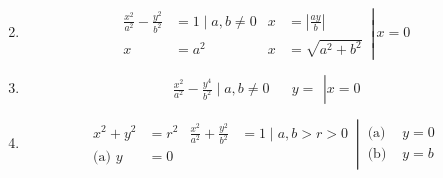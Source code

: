 \documentclass[12pt, A4]{report}
\begin{document}
\begin{enumerate}
\[					\]
				\item
					\[
						\left.\begin{aligned}
							\frac{x^2}{a^2} - \frac{y^2}{b^2} &= 1 \mid a, b \ne 0 &
								x &= \left|\frac{ay}{b}\right| \\
							x &= a^2 &
								x &= \sqrt{a^2 + b^2}
						\end{aligned}\,\right|\, x = 0
					\]
				\item
				\[
					\left.\begin{aligned}
						\frac{x^2}{a^2} - \frac{y^4}{b^2} \mid a, b \ne 0 &&
							y = 
					\end{aligned}\right| x = 0
				\]
				\item
					\[
						\left.\begin{aligned}
							x^2 + y^2 &= r^2 & 
								\frac{x^2}{a^2} + \frac{y^2}{b^2} &= 1 
								\mid a, b > r > 0\\
							\text{(a) } y &= 0
						\end{aligned}\,\right|\,
						\begin{aligned}
							\text{(a) } &y = 0 \\
							\text{(b) } &y = b
						\end{aligned}
					\]
			\end{enumerate}
			\newpage
\end{document}
